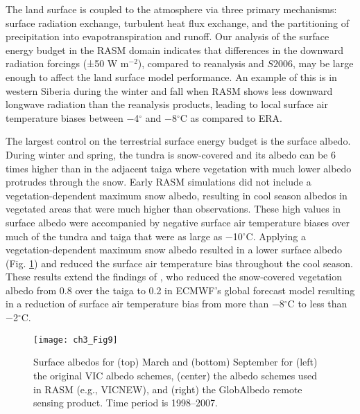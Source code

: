 The land surface is coupled to the atmosphere via three primary mechanisms: surface radiation exchange, turbulent heat flux exchange, and the partitioning of precipitation into evapotranspiration and runoff.
Our analysis of the surface energy budget in the RASM domain indicates that differences in the downward radiation forcings (±50 W m$^{−2}$), compared to reanalysis and $S2006$, may be large enough to affect the land surface model performance.
An example of this is in western Siberia during the winter and fall when RASM shows less downward longwave radiation than the reanalysis products, leading to local surface air temperature biases between −4$^{\circ}$ and −8$^{\circ}$C as compared to ERA.

The largest control on the terrestrial surface energy budget is the surface albedo.
During winter and spring, the tundra is snow-covered and its albedo can be 6 times higher than in the adjacent taiga \citep{Chapin_2000b} where vegetation with much lower albedo protrudes through the snow.
Early RASM simulations did not include a vegetation-dependent maximum snow albedo, resulting in cool season albedos in vegetated areas that were much higher than observations.
These high values in surface albedo were accompanied by negative surface air temperature biases over much of the tundra and taiga that were as large as −10$^{\circ}$C.
Applying a vegetation-dependent maximum snow albedo resulted in a lower surface albedo (Fig. \ref{fig:albedo_maps}) and reduced the surface air temperature bias throughout the cool season.
These results extend the findings of \citet{Viterbo_1999}, who reduced the snow-covered vegetation albedo from 0.8 over the taiga to 0.2 in ECMWF’s global forecast model resulting in a reduction of surface air temperature bias from more than −8$^{\circ}$C to less than −2$^{\circ}$C.

\begin{figure}
  \centering
  \texttt{[image: ch3\_Fig9]}
  \caption{Surface albedos for (top) March and (bottom) September for (left) the original VIC albedo schemes, (center) the albedo schemes used in RASM (e.g., VICNEW), and (right) the GlobAlbedo remote sensing product.
  Time period is 1998–2007.}
  \label{fig:albedo_maps}
\end{figure}

